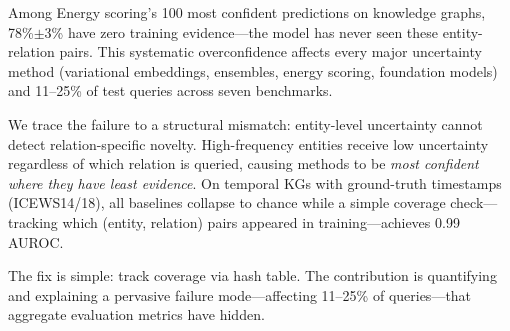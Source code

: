 
Among Energy scoring's 100 most confident predictions on knowledge graphs, 78\%$\pm$3\% have zero training evidence---the model has never seen these entity-relation pairs. This systematic overconfidence affects every major uncertainty method (variational embeddings, ensembles, energy scoring, foundation models) and 11--25\% of test queries across seven benchmarks.

We trace the failure to a structural mismatch: entity-level uncertainty cannot detect relation-specific novelty. High-frequency entities receive low uncertainty regardless of which relation is queried, causing methods to be \emph{most confident where they have least evidence}. On temporal KGs with ground-truth timestamps (ICEWS14/18), all baselines collapse to chance while a simple coverage check---tracking which (entity, relation) pairs appeared in training---achieves 0.99 AUROC.

The fix is simple: track coverage via hash table. The contribution is quantifying and explaining a pervasive failure mode---affecting 11--25\% of queries---that aggregate evaluation metrics have hidden.
